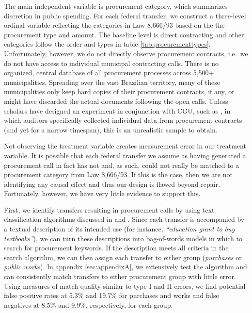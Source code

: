 \documentclass[11pt]{article}
\begin{document}
The main independent variable is procurement category, which summarizes discretion in public spending. For each federal transfer, we construct a three-level ordinal variable reflecting the categories in Law 8,666/93 based on the the procurement type and amount. The baseline level is direct contracting and other categories follow the order and types in table \ref{tab:procurementtypes}. Unfortunately, however, we do not directly observe procurement contracts, i.e.~we do not have access to individual municipal contracting calls. There is no organized, central database of all procurement processes across 5,500+ municipalities. Spreading over the vast Brazilian territory, many of these municipalities only keep hard copies of their procurement contracts, if any, or might have discarded the actual documents following the open calls. Unless scholars have designed an experiment in conjunction with CGU, such as \citet{ZamboniAuditRiskRent2018}, in which auditors specifically collected individual data from procurement contracts (and yet for a narrow timespan), this is an unrealistic sample to obtain.

Not observing the treatment variable creates measurement error in our treatment variable. It is possible that each federal transfer we assume as having generated a procurement call in fact has not and, as such, could not really be matched to a procurement category from Law 8,666/93. If this is the case, then we are not identifying any causal effect and thus our design is flawed beyond repair. Fortunately, however, we have very little evidence to support this.

First, we identify transfers resulting in procurement calls by using text classification algorithms discussed in \citet{GrimmerTextDataPromise2013a} and \citet{AssumpcaotextfindDataDrivenText2018}. Since each transfer is accompanied by a textual description of its intended use (for instance, \emph{``education grant to buy textbooks''}), we can turn these descriptions into bag-of-words models in which to search for procurement keywords. If the description meets all criteria in the search algorithm, we can then assign each transfer to either group (\emph{purchases} or \emph{public works}). In appendix \ref{sec:appendixA}, we extensively test the algorithm and can consistently match transfers to either procurement group with little error. Using measures of match quality similar to type I and II errors, we find potential false positive rates at 5.3\% and 19.7\% for purchases and works and false negatives at 8.5\% and 9.9\%, respectively, for each group.
\end{document}
